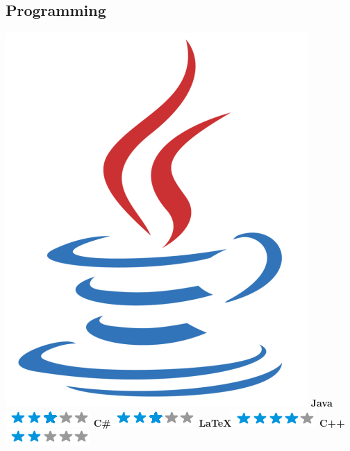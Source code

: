 \documentclass[a4paper]{friggeri-cv}
\begin{document}
\begin{aside}
  \section{Programming}
   \includegraphics[scale=0.03]{img/Java_logo.png} \textbf{Java}\includegraphics[scale=0.40]{img/3stars.png}
    \textbf{C\#}\includegraphics[scale=0.40]{img/3stars.png}
    \textbf{\LaTeX}\includegraphics[scale=0.40]{img/4stars.png}
    \textbf{C++}\includegraphics[scale=0.40]{img/2stars.png}

\end{aside}
\end{document}
